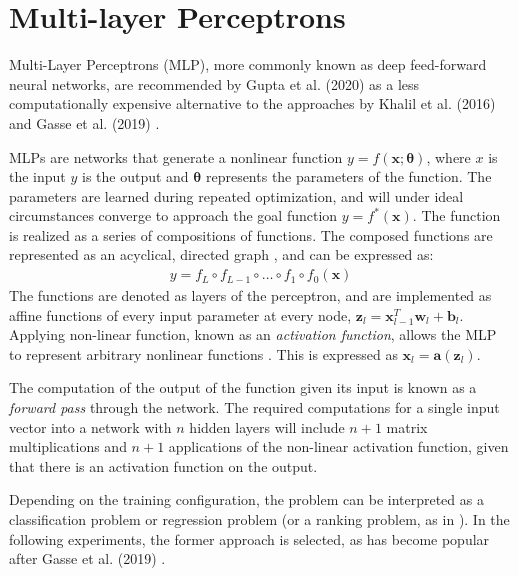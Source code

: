 \section{Multi-layer Perceptrons}

Multi-Layer Perceptrons (MLP), more commonly known as deep feed-forward neural networks, are recommended by Gupta et al. (2020) \cite{gupta2020hybrid} as a less computationally expensive alternative to the approaches by Khalil et al. (2016) \cite{khalil2016learning} and Gasse et al. (2019) \cite{gasse2019exact}. 

MLPs are networks that generate a nonlinear function $y = f(\mathbf{x}; \bm{\theta})$, where $x$ is the input $y$ is the output and $\bm{\theta}$ represents the parameters of the function. The parameters are learned during repeated optimization, and will under ideal circumstances converge to approach the goal function $y = f^*(\mathbf{x})$. The function is realized as a series of compositions of functions. The composed functions are represented as an acyclical, directed graph \cite{nielsen2018neural}, and can be expressed as:
\begin{align}
    y = f_L \circ f_{L-1} \circ \ldots \circ f_{1} \circ f_{0} (\mathbf{x})  
\end{align}
The functions are denoted as layers of the perceptron, and are implemented as affine functions of every input parameter at every node, $\mathbf{z}_l = \mathbf{x}_{l-1}^T \mathbf{w}_l + \mathbf{b}_l$. Applying non-linear function, known as an \textit{activation function}, allows the \gls{MLP} to represent arbitrary nonlinear functions \cite{goodfellow2016deep}. This is expressed as $\mathbf{x}_l = \mathbf{a}(\mathbf{z}_l)$.

The computation of the output of the function given its input is known as a \textit{forward pass} through the network. The required computations for a single input vector into a network with $ n $ hidden layers will include $ n + 1 $ matrix multiplications and $ n + 1 $ applications of the non-linear activation function, given that there is an activation function on the output. 

Depending on the training configuration, the problem can be interpreted as a classification problem or regression problem (or a ranking problem, as in \cite{khalil2016learning}). In the following experiments, the former approach is selected, as has become popular after Gasse et al. (2019) \cite{gasse2019exact}. 





